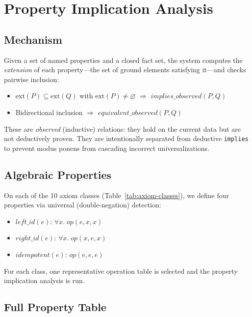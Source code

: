 \section{Property Implication Analysis}
\label{sec:property}

\subsection{Mechanism}

Given a set of named properties and a closed fact set, the system computes the \emph{extension} of each property---the set of ground elements satisfying it---and checks pairwise inclusion:

\begin{itemize}
\item $\mathrm{ext}(P) \subseteq \mathrm{ext}(Q)$ with $\mathrm{ext}(P) \neq \varnothing$ $\Rightarrow$ $\mathit{implies\_observed}(P, Q)$
\item Bidirectional inclusion $\Rightarrow$ $\mathit{equivalent\_observed}(P, Q)$
\end{itemize}

These are \emph{observed} (inductive) relations: they hold on the current data but are not deductively proven. They are intentionally separated from deductive \texttt{implies} to prevent modus ponens from cascading incorrect universalizations.

\subsection{Algebraic Properties}

On each of the 10 axiom classes (Table~\ref{tab:axiom-classes}), we define four properties via universal (double-negation) detection:

\begin{itemize}
\item $\mathit{left\_id}(e)$: $\forall x.\; \mathit{op}(e, x, x)$
\item $\mathit{right\_id}(e)$: $\forall x.\; \mathit{op}(x, e, x)$
\item $\mathit{idempotent}(e)$: $\mathit{op}(e, e, e)$
\end{itemize}

For each class, one representative operation table is selected and the property implication analysis is run.

\subsection{Full Property Table}

